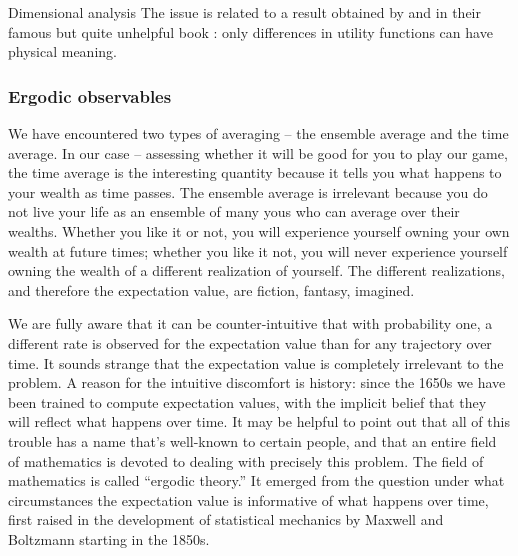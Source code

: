 \begin{excursion}{Dimensional analysis}
The issue is related to a result obtained by  and 
 in their 
famous but quite unhelpful book \cite{vonNeumannMorgenstern1944}: 
only differences in utility functions can have physical meaning.
\end{excursion}

\subsubsection{Ergodic observables}

We have encountered two types of averaging -- the ensemble average and the
time average. In our case -- assessing whether it will be good for you to play our 
game, the time average is the interesting quantity because it tells you what happens
to your wealth as time passes. The ensemble average is irrelevant 
because you do not live your life as an ensemble of many yous who can average
over their wealths. Whether you like it or not, you will experience yourself owning 
your own wealth at future times; whether you like it not, you will never experience
yourself owning the wealth of a different realization of yourself. The different realizations,
and therefore the expectation value, are fiction, fantasy, imagined.

We are fully aware that it can be counter-intuitive that with probability one, a different
rate is observed for the expectation value than for any trajectory over time. It sounds
strange that the expectation value is completely irrelevant to the problem. A reason
for the intuitive discomfort is history: since the 1650s we have been trained to
compute expectation values, with the implicit belief that they will reflect what happens
over time. It may be helpful to point out that all of this trouble has a name that's well-known
to certain people, and that an entire field of mathematics is devoted to dealing with
precisely this problem. The field of mathematics is called ``ergodic theory.'' It emerged
from the question under what circumstances the expectation value is informative 
of what happens over time, first raised in the development of statistical mechanics by Maxwell and 
Boltzmann starting in the 1850s. 

